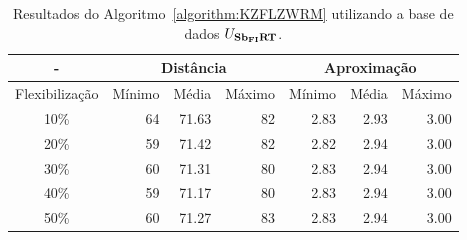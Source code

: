 \begin{table}[!htb]
  \caption{Resultados do Algoritmo~\ref{algorithm:KZFLZWRM} utilizando a base de dados $U_{\textbf{Sb\textsubscript{FI}RT}}{}$.}
  \label{table:DRUHLZFM}
  \centering
  \begin{tabular}{|c|r|r|r|r|r|r|}
    \hline
      -            & \multicolumn{3}{c|}{Distância}             & \multicolumn{3}{c|}{Aproximação}           \\ \hline
    Flexibilização & Mínimo       & Média        & Máximo       & Mínimo       & Média        & Máximo       \\ \hline  
    10\%           & 64           & 71.63        & 82           & 2.83         & 2.93         & 3.00         \\ \hline
    20\%           & 59           & 71.42        & 82           & 2.82         & 2.94         & 3.00         \\ \hline
    30\%           & 60           & 71.31        & 80           & 2.83         & 2.94         & 3.00         \\ \hline
    40\%           & 59           & 71.17        & 80           & 2.83         & 2.94         & 3.00         \\ \hline
    50\%           & 60           & 71.27        & 83           & 2.83         & 2.94         & 3.00         \\ \hline    
  \end{tabular}
\end{table}